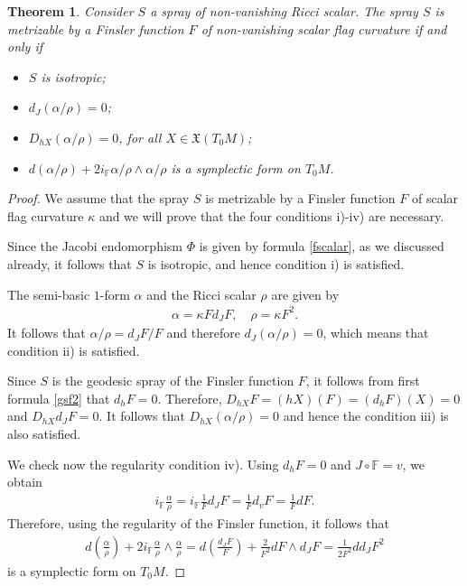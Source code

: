 \documentclass[oneside,english]{amsart}
\numberwithin{equation}{section}
\numberwithin{figure}{section}
\theoremstyle{plain}
\theoremstyle{plain}
\newtheorem{thm}{Theorem}[section]
\theoremstyle{definition}
\theoremstyle{plain}
\theoremstyle{plain}
\theoremstyle{plain}
\theoremstyle{remark}
\theoremstyle{remark}
\begin{document}
\begin{thm} 
  \label{scalar_flag}
  Consider $S$ a spray of non-vanishing Ricci scalar.  
  The spray $S$ is metrizable by a Finsler function $F$ of non-vanishing
  scalar flag curvature if and only if 
  \begin{itemize}
  \item[i)] $S$ is isotropic;
  \item[ii)] $d_J(\alpha/\rho) =0$;
  \item[iii)] $D_{hX}(\alpha/\rho) =0$, for all $X\in
    \mathfrak{X}(T_0M)$;
  \item[iv)] $d(\alpha/\rho) +  2i_{\mathbb F}\alpha/\rho \wedge
    \alpha/\rho$ is a symplectic form on $T_0M$. 
  \end{itemize}
\end{thm}
\begin{proof}
  We assume that the spray $S$ is metrizable by  a Finsler function $F$ of scalar flag curvature
  $\kappa$ and we will prove that the four conditions i)-iv) are
  necessary. 

  Since the Jacobi endomorphism $\Phi$ is given by
  formula \eqref{fscalar}, as we discussed already, it follows that $S$
  is isotropic, and hence condition i) is satisfied. 

  The semi-basic $1$-form $\alpha$ and the Ricci scalar $\rho$ are given by 
  \begin{eqnarray} \alpha=\kappa F d_JF, \quad \rho=\kappa
    F^2. \label{ark} \end{eqnarray} It follows that 
  $\alpha/\rho=d_JF/F$ and therefore $d_J(\alpha/\rho)=0$, which
  means that condition ii) is satisfied. 

  Since $S$ is the geodesic spray of the Finsler function $F$, it
  follows from first formula \eqref{gsf2} that $d_hF=0$. Therefore,
  $D_{hX}F=(hX)(F)=(d_h F)(X)=0$ and $D_{hX}d_JF=0$. It follows that
  $D_{hX}(\alpha/\rho) =0$ and hence the condition iii) is also
  satisfied. 

  We check now the regularity condition iv). Using $d_hF=0$ and
  $J\circ \mathbb{F}=v$, we obtain 
  \begin{eqnarray*}
    i_{\mathbb{F}}\frac{\alpha}{\rho}=i_{\mathbb{F}}\frac{1}{F}d_JF=\frac{1}{F}d_vF
    = \frac{1}{F}dF. \label{ifar}
  \end{eqnarray*} 
  Therefore, using the regularity of the Finsler function, it follows
  that  
  \begin{eqnarray*} d\left(\frac{\alpha}{\rho}\right)+ 2i_{\mathbb F}\frac{\alpha}{\rho} \wedge
    \frac{\alpha}{\rho} = d\left(\frac{d_J F}{F}\right)  + \frac{2}{F^2}
    dF \wedge d_JF = \frac{1}{2F^2}
    dd_JF^2 \label{symplectic} \end{eqnarray*} is a
  symplectic form on $T_0M$.


\end{proof}
\end{document}
